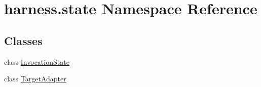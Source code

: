 \hypertarget{namespaceharness_1_1state}{}\section{harness.\+state Namespace Reference}
\label{namespaceharness_1_1state}
\subsection*{Classes}
\begin{DoxyCompactItemize}
\item 
class \mbox{\hyperlink{classharness_1_1state_1_1_invocation_state}{Invocation\+State}}
\item 
class \mbox{\hyperlink{classharness_1_1state_1_1_target_adapter}{Target\+Adapter}}
\end{DoxyCompactItemize}
